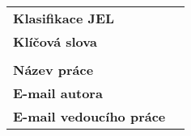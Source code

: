 \bigskip

\begin{tabular}{lp{7.7cm}}
	\textbf{Klasifikace JEL}                & \JEL                                        \\
	\textbf{Kl\'{i}\v{c}ov\'{a} slova}      & \Klic                                       \\
	                                        &                                             \\
	\textbf{N\'{a}zev pr\'{a}ce}            & \BooknameCZ                                 \\
	\textbf{E-mail autora}                  & \texttt{\href{mailto:\Email}{\Email}}       \\
	\textbf{E-mail vedouc\'{i}ho pr\'{a}ce} & \texttt{\href{mailto:\EmailSup}{\EmailSup}} \\
\end{tabular}

